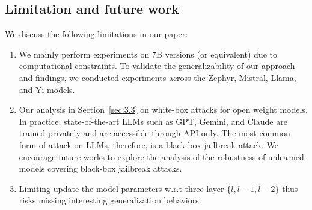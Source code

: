 \documentclass[letterpaper]{article} %
\begin{document}
\subsection{Limitation and future work}
We discuss the following limitations in our paper: 
\begin{enumerate}
    \item We mainly perform experiments on 7B versions (or equivalent) due to computational constraints. To validate the generalizability  of our approach and findings, we conducted experiments across the Zephyr, Mistral, Llama, and Yi models.
    \item Our analysis in Section~\ref{sec:3.3} on white-box attacks for open weight models. In practice, state-of-the-art  LLMs such as GPT, Gemini, and Claude are trained privately and are accessible through API only. The most common form of attack on LLMs, therefore, is a black-box jailbreak attack. We encourage future works to explore the analysis of the robustness of unlearned models covering black-box jailbreak attacks.
    \item Limiting update the model parameters w.r.t three layer $\{l, l - 1, l - 2\}$ thus risks missing interesting generalization behaviors.

\end{enumerate}

\end{document}
